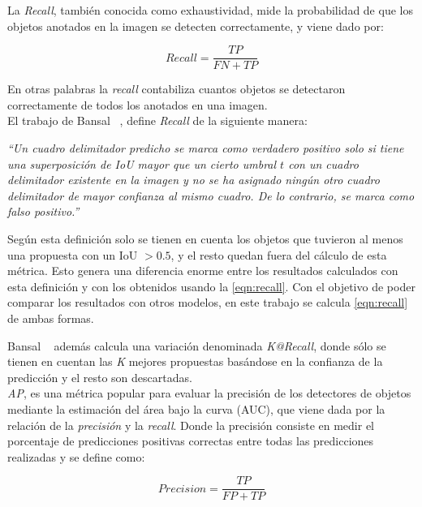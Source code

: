La \textit{Recall}, también conocida como exhaustividad, mide la probabilidad de que los objetos anotados en la imagen se detecten correctamente, y viene dado por: 

\begin{equation}
	\label{eqn:recall}
	Recall =\frac{TP}{FN+TP}
\end{equation}

En otras palabras la \textit{recall} contabiliza cuantos objetos se detectaron correctamente de todos los anotados en una imagen.\\

El trabajo de Bansal \etal~\cite{bansal2018zero}, define \textit{Recall} de la siguiente manera: 
\begin{center}
	\textit{``Un cuadro delimitador predicho se marca como verdadero positivo solo si tiene una superposición de IoU mayor que un cierto umbral $t$ con un cuadro delimitador existente en la imagen y no se ha asignado ningún otro cuadro delimitador de mayor confianza al mismo cuadro. De lo contrario, se marca como falso positivo.''}\\
\end{center}

Según esta definición solo se tienen en cuenta los objetos que tuvieron al menos una propuesta con un IoU $> 0.5$, y el resto quedan fuera del cálculo de esta métrica. Esto genera una diferencia enorme entre los resultados calculados con esta definición y con los obtenidos usando la \autoref{eqn:recall}. Con el objetivo de poder comparar los resultados con otros modelos, en este trabajo se calcula \autoref{eqn:recall} de ambas formas. 

Bansal \etal~\cite{bansal2018zero} además calcula una variación denominada \textit{K@Recall}, donde sólo se tienen en cuentan las \textit{K} mejores propuestas basándose en la confianza de la predicción y el resto son descartadas.\\


\textit{AP}, es una métrica popular para evaluar la precisión de los detectores de objetos mediante la estimación del área bajo la curva (AUC), que viene dada por la relación de la \textit{precisión} y la \textit{recall}. Donde la precisión consiste en medir el porcentaje de predicciones positivas correctas entre todas las predicciones realizadas y se define como:

\begin{equation} 
	\label{eqn:precision}
	Precision =\frac{TP}{FP+TP}
\end{equation}


